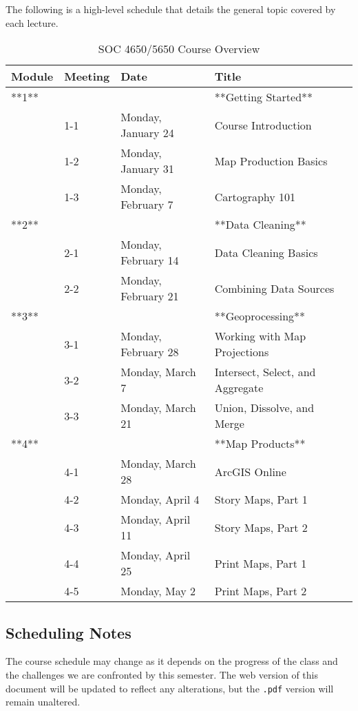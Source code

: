 \documentclass[
]{book}
\begin{document}
The following is a high-level schedule that details the general topic covered by each lecture.

\begin{table}

\caption{\label{tab:unnamed-chunk-2}SOC 4650/5650 Course Overview}
\centering
\begin{tabular}[t]{llll}
\toprule
Module & Meeting & Date & Title\\
\midrule
**1** &  &  & **Getting Started**\\
 & 1-1 & Monday, January 24 & Course Introduction\\
 & 1-2 & Monday, January 31 & Map Production Basics\\
 & 1-3 & Monday, February 7 & Cartography 101\\
**2** &  &  & **Data Cleaning**\\
\addlinespace
 & 2-1 & Monday, February 14 & Data Cleaning Basics\\
 & 2-2 & Monday, February 21 & Combining Data Sources\\
**3** &  &  & **Geoprocessing**\\
 & 3-1 & Monday, February 28 & Working with Map Projections\\
 & 3-2 & Monday, March 7 & Intersect, Select, and Aggregate\\
\addlinespace
 & 3-3 & Monday, March 21 & Union, Dissolve, and Merge\\
**4** &  &  & **Map Products**\\
 & 4-1 & Monday, March 28 & ArcGIS Online\\
 & 4-2 & Monday, April 4 & Story Maps, Part 1\\
 & 4-3 & Monday, April 11 & Story Maps, Part 2\\
\addlinespace
 & 4-4 & Monday, April 25 & Print Maps, Part 1\\
 & 4-5 & Monday, May 2 & Print Maps, Part 2\\
\bottomrule
\end{tabular}
\end{table}

\hypertarget{scheduling-notes}{%
\subsection{Scheduling Notes}\label{scheduling-notes}}

The course schedule may change as it depends on the progress of the class and the challenges we are confronted by this semester. The web version of this document will be updated to reflect any alterations, but the \texttt{.pdf} version will remain unaltered.
\end{document}
